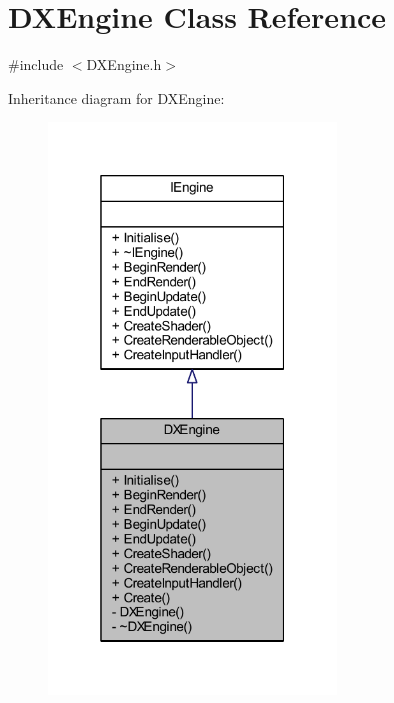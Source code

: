 \hypertarget{class_d_x_engine}{}\section{D\+X\+Engine Class Reference}
\label{class_d_x_engine}


{\ttfamily \#include $<$D\+X\+Engine.\+h$>$}



Inheritance diagram for D\+X\+Engine\+:\nopagebreak
\begin{figure}[H]
\begin{center}
\leavevmode
\includegraphics[width=217pt]{class_d_x_engine__inherit__graph}
\end{center}
\end{figure}


